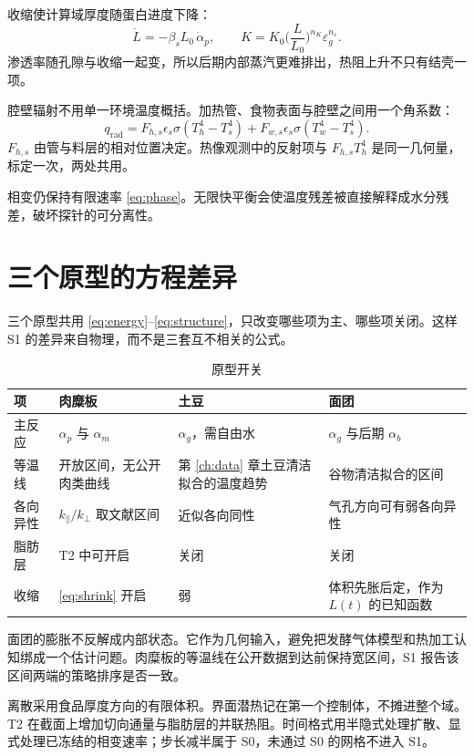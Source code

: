 收缩使计算域厚度随蛋白进度下降：
\begin{equation}
\label{eq:shrink}
\dot L=-\beta_s L_0\,\dot\alpha_p,\qquad K=K_0\Big(\frac{L}{L_0}\Big)^{n_K}\varepsilon_g^{n_\varepsilon}.
\end{equation}
渗透率随孔隙与收缩一起变，所以后期内部蒸汽更难排出，热阻上升不只有结壳一项。

腔壁辐射不用单一环境温度概括。加热管、食物表面与腔壁之间用一个角系数：
\begin{equation}
q_{\mathrm{rad}}=F_{h,s}\epsilon_s\sigma(T_h^4-T_s^4)+F_{w,s}\epsilon_s\sigma(T_w^4-T_s^4).
\end{equation}
$F_{h,s}$ 由管与料层的相对位置决定。热像观测中的反射项与 $F_{h,s}T_h^4$ 是同一几何量，标定一次，两处共用。

相变仍保持有限速率 \eqref{eq:phase}。无限快平衡会使温度残差被直接解释成水分残差，破坏探针的可分离性。

\section{三个原型的方程差异}

三个原型共用 \eqref{eq:energy}--\eqref{eq:structure}，只改变哪些项为主、哪些项关闭。这样 S1 的差异来自物理，而不是三套互不相关的公式。

\begin{table}[H]
\centering
\caption{原型开关}
\begin{tabularx}{\textwidth}{lXXX}
\toprule
项 & 肉糜板 & 土豆 & 面团 \\
\midrule
主反应 & $\alpha_p$ 与 $\alpha_m$ & $\alpha_g$，需自由水 & $\alpha_g$ 与后期 $\alpha_b$ \\
等温线 & 开放区间，无公开肉类曲线 & 第 \ref{ch:data} 章土豆清洁拟合的温度趋势 & 谷物清洁拟合的区间 \\
各向异性 & $k_\parallel/k_\perp$ 取文献区间 & 近似各向同性 & 气孔方向可有弱各向异性 \\
脂肪层 & T2 中可开启 & 关闭 & 关闭 \\
收缩 & \eqref{eq:shrink} 开启 & 弱 & 体积先胀后定，作为 $L(t)$ 的已知函数 \\
\bottomrule
\end{tabularx}
\end{table}

面团的膨胀不反解成内部状态。它作为几何输入，避免把发酵气体模型和热加工认知绑成一个估计问题。肉糜板的等温线在公开数据到达前保持宽区间，S1 报告该区间两端的策略排序是否一致。

离散采用食品厚度方向的有限体积。界面潜热记在第一个控制体，不摊进整个域。T2 在截面上增加切向通量与脂肪层的并联热阻。时间格式用半隐式处理扩散、显式处理已冻结的相变速率；步长减半属于 S0，未通过 S0 的网格不进入 S1。

